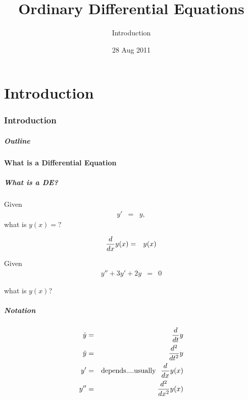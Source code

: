 \part{Introduction}
\section{Introduction}

\title{Ordinary Differential Equations}
\subtitle{Introduction}

\date{28 Aug 2011}

\begin{frame}
  \titlepage
\end{frame}

\begin{frame}
  \frametitle{Outline}
  \tableofcontents[pausesection,hideothersubsections,sectionstyle=show/hide]
\end{frame}


\subsection{What is a Differential Equation}


\begin{frame}
  \frametitle{What is a DE?}

  Given
  \begin{eqnarray*}
    y' & = & y,
  \end{eqnarray*}
  what is $y(x)=?$

  \begin{eqnarray*}
    \deriv{y(x)}{x} & = & y(x)
  \end{eqnarray*}

\end{frame}


\begin{frame}
  Given
  \begin{eqnarray*}
    y'' + 3y' +2y & = & 0
  \end{eqnarray*}

  what is $y(x)$?

\end{frame}

\begin{frame}
  \frametitle{Notation}
  \begin{eqnarray*}
    \dot{y} & = & \deriv{y}{t} \\
    \ddot{y} & = & \derivTwo{y}{t} \\
    y' & = & \mathrm{depends.... usually ~~} \deriv{y(x)}{x} \\
    y'' & = & \derivTwo{y(x)}{x}
  \end{eqnarray*}
\end{frame}

